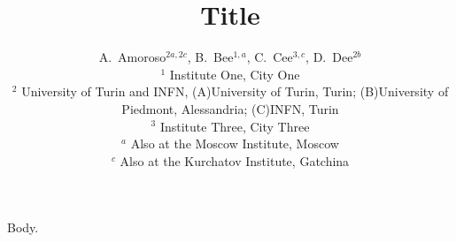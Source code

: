 \documentclass{article}
\title{Title}
\author{A.~Amoroso$^{2a,2c}$, B.~Bee$^{1,a}$, C.~Cee$^{3,c}$, D.~Dee$^{2b}$\\
$^{1}$ Institute One, City One\\
$^{2}$ University of Turin and INFN, (A)University of Turin, Turin; (B)University of Piedmont, Alessandria; (C)INFN, Turin\\
$^{3}$ Institute Three, City Three\\
$^{a}$ Also at the Moscow Institute, Moscow\\
$^{c}$ Also at the Kurchatov Institute, Gatchina}
\begin{document}
\maketitle
Body.
\end{document}
